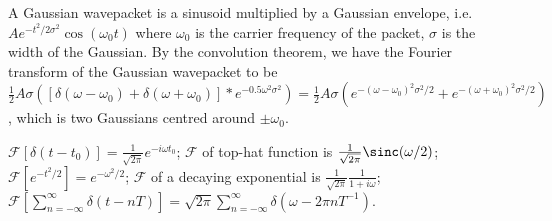 \documentclass[a4paper]{article}
\begin{document}
\begin{eg}
A Gaussian wavepacket is a sinusoid multiplied by a Gaussian envelope, i.e. $Ae^{-t^2/2\sigma^2}\cos(\omega_0t)$ where $\omega_0$ is the carrier frequency of the packet, $\sigma$ is the width of the Gaussian. By the convolution theorem, we have the Fourier transform of the Gaussian wavepacket to be $\frac{1}{2}A\sigma([\delta(\omega-\omega_0)+\delta(\omega+\omega_0)]*e^{-0.5\omega^2\sigma^2})=\frac{1}{2}A\sigma(e^{-(\omega-\omega_0)^2\sigma^2/2}+e^{-(\omega+\omega_0)^2\sigma^2/2})$, which is two Gaussians centred around $\pm\omega_0$.
\end{eg}
\begin{eg}
$\mathcal{F}[\delta(t-t_0)]=\frac{1}{\sqrt{2\pi}}e^{-i\omega t_0}$; $\mathcal{F}$ of top-hat function is $\frac{1}{\sqrt{2\pi}}\sinc(\omega/2)$; $\mathcal{F}[e^{-t^2/2}]=e^{-\omega^2/2}$; $\mathcal{F}$ of a decaying exponential is $\frac{1}{\sqrt{2\pi}}\frac{1}{1+i\omega}$; $\mathcal{F}[\sum_{n=-\infty}^\infty\delta(t-nT)]=\sqrt{2\pi}\sum_{n=-\infty}^\infty\delta(\omega-2\pi nT^{-1})$.
\end{eg}
\newpage
\end{document}
